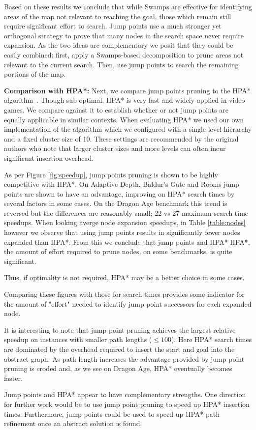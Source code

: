 Based on these results we conclude that while Swamps are effective for
identifying areas of the map not relevant to reaching the goal, those which
remain still require significant effort to search.  Jump points use a much
stronger yet orthogonal strategy to prove that many nodes in the search space
never require expansion.  As the two ideas are complementary we posit that they
could be easily combined: first, apply a Swamps-based decomposition to prune
areas not relevant to the current search.  Then, use jump points to search the
remaining portions of the map.

\textbf{Comparison with HPA*: }
Next, we compare jump points pruning to the HPA* algorithm~\cite{botea04}.
Though sub-optimal, HPA* is very fast and widely applied in video games. We
compare against it to establish whether or not jump points are equally
applicable in similar contexts.  When evaluating HPA* we used our own
implementation of the algorithm which we configured with a single-level
hierarchy and a fixed cluster size of 10.  These settings are recommended by the
original authors who note that larger cluster sizes and more levels can often
incur significant insertion overhead.

As per Figure \ref{fig:speedup}, jump points pruning is shown to be 
highly competitive with HPA*.
On Adaptive Depth, Baldur's Gate and Rooms jump points are shown to have an 
advantage, improving on HPA* search times by several factors in some cases.
On the Dragon Age benchmark this trend is reversed but the differences are
reasonably small; 22 vs 27 maximum search time speedups.
When looking averge node expansion speedups, in Table \ref{table:nodes} however
we observe that using jump points results in significantly fewer nodes expanded than HPA*.
From this we conclude that jump points and HPA* 
HPA*, the amount of effort required to prune nodes, on some benchmarks, is quite
significant. 

Thus, if optimality is not required, HPA* may be a better choice
in some cases.

Comparing these figures with those for search times provides some indicator 
for the amount of "effort" needed to identify jump point successors for each expanded node.


It is interesting to note that jump point pruning achieves the largest relative
speedup on instances with smaller path lengths
($\leq 100$). Here HPA* search times are dominated by the overhead required to
insert the start and goal into the abstract graph.
As path length increases the advantage provided by jump point pruning is eroded
and, as we see on Dragon Age, HPA* eventually becomes faster.

Jump points and HPA* appear to have complementary strengths.
One direction for further work would be to use jump point pruning to speed up
HPA* insertion times. Furthermore,  jump points could be used to speed up 
HPA* path refinement once an abstract solution is found.
